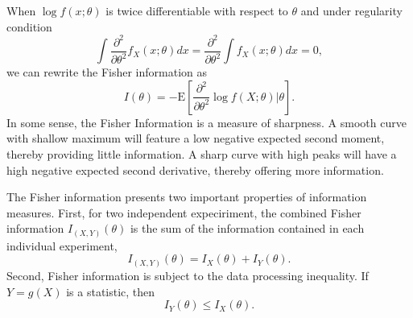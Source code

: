 When $\log f(x; \theta)$ is twice differentiable with respect to $\theta$ and under regularity condition
\begin{equation*}
\int \frac{\partial^2}{\partial \theta^2} f_X (x; \theta) dx
= \frac{\partial^2}{\partial \theta^2} \int f_X (x; \theta) dx = 0 ,
\end{equation*}
we can rewrite the Fisher information as
\begin{equation*}
I (\theta)
= - \mathrm{E} \left[ \frac{\partial^2}{\partial \theta^2} \log f (X; \theta) \Big| \theta \right] .
\end{equation*}
In some sense, the Fisher Information is a measure of sharpness.
A smooth curve with shallow maximum will feature a low negative expected second moment, thereby providing little information.
A sharp curve with high peaks will have a high negative expected second derivative, thereby offering more information.

The Fisher information presents two important properties of information measures.
First, for two independent expeciriment, the combined Fisher information $I_{(X,Y)} (\theta)$ is the sum of the information contained in each individual experiment,
\begin{equation*}
I_{(X,Y)} (\theta) = I_{X} (\theta) + I_{Y} (\theta) .
\end{equation*}
Second, Fisher information is subject to the data processing inequality.
If $Y = g(X)$ is a statistic, then
\begin{equation*}
I_Y (\theta) \leq I_X (\theta).
\end{equation*}


